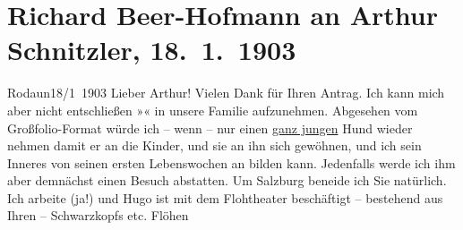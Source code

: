 

         
         \renewcommand{\erwaehntePersonen}{Personen: Hugo von Hofmannsthal, Olga Schnitzler, Heinrich Schnitzler, Gustav Schwarzkopf}
         \renewcommand{\erwaehnteInstitutionen}{Institutionen: Akademischer Verein für Kunst und Literatur}
         \renewcommand{\erwaehnteOrte}{Orte: Hallein, Rodaun, Salzburg, Theater an der Wien, Wien}
         \renewcommand{\erwaehnteWerke}{Werke: Elpenor. Trauerspiel}
               \section[Richard Beer-Hofmann an Arthur Schnitzler, 18. 1. 1903]{ Richard Beer-Hofmann an Arthur Schnitzler,
               18. 1. 1903}\nopagebreak{}\rehead{ }\begin{ledgroupsized}[t]{13cm}\normalsize\beginnumbering \toendnotes[C]{\smallbreak\pagebreak[2]} 
\toendnotes[C]{\smallbreak}\pstart
           \raggedleft{}{\pb}Rodaun18/1 1903\pend
           \pstart
           Lieber Arthur! Vielen Dank für Ihren Antrag. Ich kann mich aber
               nicht entschließen »\label{K_L01267_1v}\label{K_L01267_1h}« in unsere
               Familie aufzunehmen. Abgesehen vom Großfolio-Format würde ich – wenn – nur einen \uline{ganz jungen} Hund wieder nehmen damit er an die Kinder,
               und sie an ihn sich gewöhnen, und ich sein Inneres von seinen ersten Lebenswochen an
               bilden kann. Jedenfalls werde ich ihm aber demnächst einen Besuch abstatten. Um Salzburg beneide ich Sie na{\pb}türlich. Ich arbeite (ja!) und Hugo ist mit dem Flohtheater beschäftigt –
               bestehend aus Ihren – Schwarzkopfs etc. Flöhen

\end{ledgroupsized}
